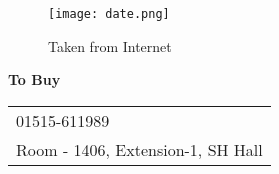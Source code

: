 \documentclass{article}
\begin{document}
\vspace*{\fill}
\begin{center}
  \begin{figure}
  \texttt{[image: date.png]}
    \caption{Taken from Internet}
  \end{figure}
  {\Huge\textbf{To Buy}}
  \\
  \LARGE
\vspace{2cm}
  \begin{tabular}{l}
 \faPhone{} 01515-611989\\
  \faHome{} Room - 1406, Extension-1, SH Hall
  \end{tabular}
\end{center}
\vspace*{\fill}
 
\end{document}
